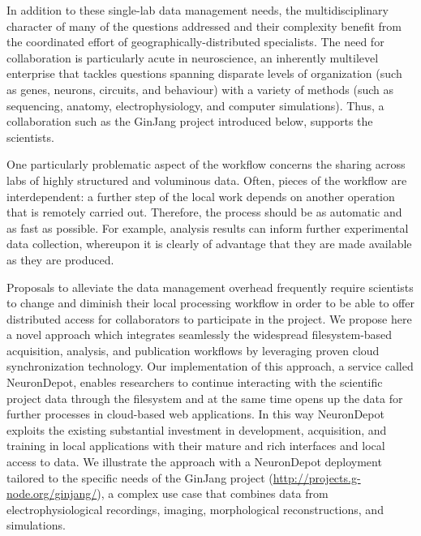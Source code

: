 \documentclass{frontiersSCNS} %
\begin{document}
In addition to these single-lab data management needs, the multidisciplinary
character of many of the questions addressed and their complexity benefit from
the coordinated effort of geographically-distributed specialists. The need for
collaboration is particularly acute in neuroscience, an inherently multilevel
enterprise that tackles questions spanning disparate levels of organization
(such as genes, neurons, circuits, and behaviour) with a variety of methods
(such as sequencing, anatomy, electrophysiology, and computer simulations).
Thus, a collaboration such as the GinJang project introduced below, supports
the scientists.

One particularly problematic aspect of the workflow concerns the sharing
across labs of highly structured and voluminous data. Often, pieces of the
workflow are interdependent: a further step of the local work depends on
another operation that is remotely carried out. Therefore, the process should
be as automatic and as fast as possible. For example, analysis results can
inform further experimental data collection, whereupon it is clearly of
advantage that they are made available as they are produced.

Proposals to alleviate the data management overhead frequently require
scientists to change and diminish their local processing workflow in order to
be able to offer distributed access for collaborators to participate in the
project. We propose here a novel approach which integrates seamlessly the
widespread filesystem-based acquisition, analysis, and publication workflows by
leveraging proven cloud synchronization technology. Our implementation of this
approach, a service called NeuronDepot, enables researchers to continue
interacting with the scientific project data through the filesystem and at the
same time opens up the data for further processes in cloud-based web
applications. In this way NeuronDepot exploits the existing substantial
investment in development, acquisition, and training in local applications with
their mature and rich interfaces and local access to data. We illustrate the
approach with a NeuronDepot deployment tailored to the specific needs of the
GinJang project (\url{http://projects.g-node.org/ginjang/}), a complex use case
that combines data from electrophysiological recordings, imaging, morphological
reconstructions, and simulations.
\end{document}
